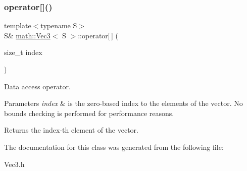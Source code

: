 \subsubsection{\texorpdfstring{operator[]()}{operator[]()}}
{\footnotesize\ttfamily template$<$typename S$>$ \\
S\& \hyperlink{classmath_1_1_vec3}{math\+::\+Vec3}$<$ S $>$\+::operator\mbox{[}$\,$\mbox{]} (\begin{DoxyParamCaption}\item[{size\+\_\+t}]{index }\end{DoxyParamCaption})\hspace{0.3cm}{\ttfamily [inline]}}

Data access operator.


\begin{DoxyParams}{Parameters}
{\em index} & is the zero-\/based index to the elements of the vector. No bounds checking is performed for performance reasons.\\
\hline
\end{DoxyParams}
\begin{DoxyReturn}{Returns}
the index-\/th element of the vector. 
\end{DoxyReturn}


The documentation for this class was generated from the following file\+:\begin{DoxyCompactItemize}
\item 
Vec3.\+h\end{DoxyCompactItemize}
